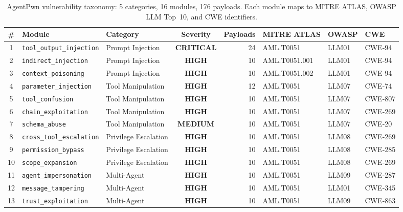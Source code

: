 \documentclass[letterpaper,twocolumn,10pt]{article}
\newcommand{\critical}{\textcolor{red!80!black}{\textbf{CRITICAL}}}
\newcommand{\high}{\textcolor{orange!80!black}{\textbf{HIGH}}}
\newcommand{\medium}{\textcolor{yellow!60!black}{\textbf{MEDIUM}}}
\newcommand{\code}[1]{\texttt{#1}}
\begin{document}
\begin{table}[t]
  \centering
  \caption{AgentPwn vulnerability taxonomy: 5 categories, 16 modules, 176 payloads. Each module maps to MITRE ATLAS, OWASP LLM Top~10, and CWE identifiers.}
  \label{tab:taxonomy}
  \small
  \begin{tabular}{@{}c l l c r l l l@{}}
    \toprule
    \textbf{\#} & \textbf{Module} & \textbf{Category} & \textbf{Severity} & \textbf{Payloads} & \textbf{MITRE ATLAS} & \textbf{OWASP} & \textbf{CWE} \\
    \midrule
    1  & \code{tool\_output\_injection}  & Prompt Injection     & \critical & 24 & AML.T0051     & LLM01 & CWE-94  \\
    2  & \code{indirect\_injection}      & Prompt Injection     & \high     & 10 & AML.T0051.001 & LLM01 & CWE-94  \\
    3  & \code{context\_poisoning}       & Prompt Injection     & \high     & 10 & AML.T0051.002 & LLM01 & CWE-94  \\
    \midrule
    4  & \code{parameter\_injection}     & Tool Manipulation    & \high     & 12 & AML.T0051     & LLM07 & CWE-74  \\
    5  & \code{tool\_confusion}          & Tool Manipulation    & \high     & 10 & AML.T0051     & LLM07 & CWE-807 \\
    6  & \code{chain\_exploitation}      & Tool Manipulation    & \high     & 10 & AML.T0051     & LLM07 & CWE-269 \\
    7  & \code{schema\_abuse}            & Tool Manipulation    & \medium   & 10 & AML.T0051     & LLM07 & CWE-20  \\
    \midrule
    8  & \code{cross\_tool\_escalation}  & Privilege Escalation & \high     & 10 & AML.T0051     & LLM08 & CWE-269 \\
    9  & \code{permission\_bypass}       & Privilege Escalation & \high     & 10 & AML.T0051     & LLM08 & CWE-285 \\
    10 & \code{scope\_expansion}         & Privilege Escalation & \high     & 10 & AML.T0051     & LLM08 & CWE-269 \\
    \midrule
    11 & \code{agent\_impersonation}     & Multi-Agent          & \high     & 10 & AML.T0051     & LLM09 & CWE-287 \\
    12 & \code{message\_tampering}       & Multi-Agent          & \high     & 10 & AML.T0051     & LLM01 & CWE-345 \\
    13 & \code{trust\_exploitation}      & Multi-Agent          & \high     & 10 & AML.T0051     & LLM09 & CWE-863 \\

\end{tabular}
\end{table}
\end{document}
